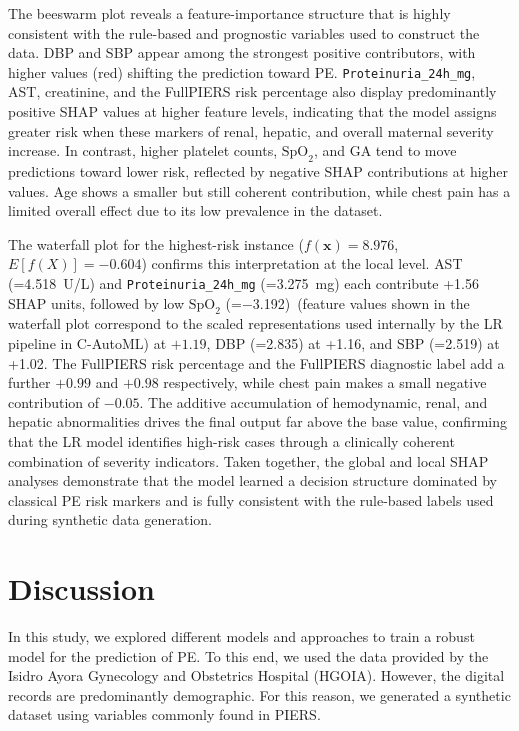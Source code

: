 \documentclass[diagnostics,article,accept,pdftex,moreauthors]{Definitions/mdpi}
\begin{document}
The beeswarm plot reveals a feature-importance structure that is
highly consistent with the rule-based and prognostic variables used to
construct the data. \ac{DBP} and \ac{SBP} appear among the strongest
positive contributors, with higher values (red) shifting the
prediction toward \ac{PE}. \texttt{Proteinuria\_24h\_mg},
\ac{AST}, creatinine, and the FullPIERS risk percentage also display
predominantly positive \ac{SHAP} values at higher feature levels,
indicating that the model assigns greater risk when these markers of
renal, hepatic, and overall maternal severity increase. In contrast,
higher platelet counts, $\text{SpO}_2$, {and} \ac{GA} %
tend to move predictions toward lower risk, reflected by negative
\ac{SHAP} contributions at higher values. Age shows a smaller but
still coherent contribution, while chest pain has a limited overall
effect due to its low prevalence in the dataset.

The waterfall plot for the highest-risk instance ($f(\mathbf{x}) =
8.976$, $E{[f(X)]} = -0.604$) confirms this interpretation at the
local level. \ac{AST} (=4.518~U/L) and
\texttt{Proteinuria\_24h\_mg} (=3.275~mg) each contribute
+1.56 \ac{SHAP} units, followed by low $\text{SpO}_2$ (=$-$3.192)~({feature values shown in the waterfall plot
  correspond to the scaled representations used internally by the
  \ac{LR} pipeline in \ac{C-AutoML}}) at $+1.19$, \ac{DBP} (=2.835) at +1.16, and \ac{SBP}
(=2.519) at +1.02. The FullPIERS risk percentage and the
FullPIERS diagnostic label add a further $+0.99$ and $+0.98$
respectively, while chest pain makes a small negative contribution of
$-0.05$. The additive accumulation of hemodynamic, renal, and hepatic
abnormalities drives the final output far above the base value,
confirming that the \ac{LR} model identifies high-risk cases through a
clinically coherent combination of severity indicators. Taken
together, the global and local \ac{SHAP} analyses demonstrate that
the model learned a decision structure dominated by classical
\ac{PE} risk markers and is fully consistent with the
rule-based labels used during synthetic data generation.

\section{Discussion}
\label{sec:discussion}

In this study, we explored different models and approaches to train a
robust model for the prediction of \ac{PE}. To this end, we
used the data provided by the Isidro Ayora Gynecology and Obstetrics
Hospital (\ac{HGOIA}). However, the digital records are predominantly
demographic. For this reason, we generated a synthetic dataset using
variables commonly found in \ac{PIERS}.
\end{document}
